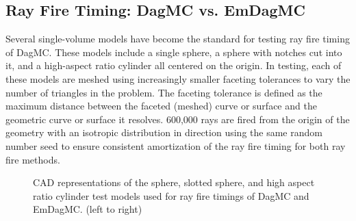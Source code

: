 \documentclass{anstrans}
\begin{document}

\subsection{Ray Fire Timing: DagMC vs. EmDagMC}

Several single-volume models have become the standard for testing ray fire timing of DagMC. These models include a single sphere, a sphere with notches cut into it, and a high-aspect ratio cylinder all centered on the origin. In testing, each of these models are meshed using increasingly smaller faceting tolerances to vary the number of triangles in the problem. The faceting tolerance is defined as the maximum distance between the faceted (meshed) curve or surface and the geometric curve or surface it resolves. 600,000 rays are fired from the origin of the geometry with an isotropic distribution in direction using the same random number seed to ensure consistent amortization of the ray fire timing for both ray fire methods.

\begin{figure}

  \begin{center}

    \caption{CAD representations of the sphere, slotted sphere, and high aspect ratio cylinder test models used for ray fire timings of DagMC and EmDagMC. (left to right) }

  \end{center}
\vspace{-0.3cm}
\end{figure}
\end{document}
